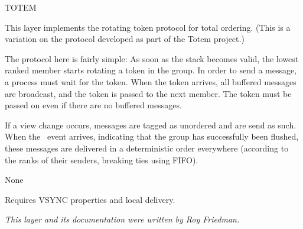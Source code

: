 %
%
%
\begin{Layer}{TOTEM}

This layer implements the rotating token protocol for total ordering.  (This is
a variation on the protocol developed as part of the Totem project.)

\begin{Protocol}
The protocol here is fairly simple: As soon as the stack becomes valid, the
lowest ranked member starts rotating a token in the group. In order to send a
message, a process must wait for the token. When the token arrives, all
buffered messages are broadcast, and the token is passed to the next member.
The token must be passed on even if there are no buffered messages.

If a view change occurs, messages are tagged as unordered and are send as
such.
When the \UpView\ event arrives, indicating that the group has successfully
been flushed, these messages are delivered in a deterministic order everywhere
(according to the ranks of their senders, breaking ties using FIFO).
\end{Protocol}

\begin{Parameters}
\item None
\end{Parameters}

\begin{Properties}
\item
Requires VSYNC properties and local delivery.
\end{Properties}

\begin{Sources}
\end{Sources}

\begin{GenEvent}
\genevent{\DnAck}
\genevent{\DnCast}
\end{GenEvent}

\begin{Testing}
\item
\todo{}
\end{Testing}

\emph{This layer and its documentation were written by Roy Friedman.}
\end{Layer}
